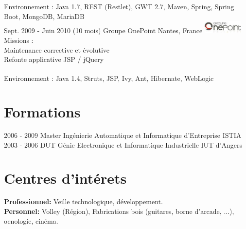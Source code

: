 \documentclass[]{cv-style}          %
\begin{document}
\begin{entrylist}
{Environnement : Java 1.7, REST (Restlet), GWT 2.7, Maven, Spring, Spring Boot, MongoDB, MariaDB\\
}
\entry
  {Sept. 2009 - Juin 2010 (10 mois)}
  {Groupe OnePoint}
  {Nantes, France}
  {\hfill\includegraphics[width=2cm]{onepoint.png}\\
Missions : \\
\hspace{0.6cm}Maintenance corrective et évolutive\\
\hspace{0.6cm}Refonte applicative JSP / jQuery\\
\\
Environnement : Java 1.4, Struts, JSP, Ivy, Ant, Hibernate, WebLogic
}
\end{entrylist}

\section{Formations}
  \vspace{-0.2cm}
\begin{entrylist}
\entry
{2006 - 2009}
{\hspace{1cm}Master {\normalfont Ingénierie Automatique et Informatique d'Entreprise}}
{\hspace{2cm}ISTIA}
{\vspace{-0.6cm}}
\entry
{2003 - 2006}
{\hspace{0.7cm}DUT {\normalfont Génie Electronique et Informatique Industrielle}}
{\hspace{2cm}IUT d'Angers}
{\vspace{-0.6cm}}
\end{entrylist}

\section{Centres d'intérets}
  \vspace{-0.2cm}

\textbf{Professionnel:} Veille technologique, développement.
\\
\textbf{Personnel:} Volley (Région), Fabrications bois (guitares, borne d'arcade, ...), oenologie, cinéma.

\end{document}
